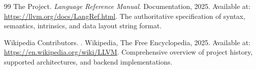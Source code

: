 \begin{thebibliography}{99}
The  Project. \textit{ Language Reference Manual}.  Documentation, 2025. Available at: \url{https://llvm.org/docs/LangRef.html}. The authoritative specification of   syntax, semantics, intrinsics, and data layout string format.

Wikipedia Contributors. \textit{}. Wikipedia, The Free Encyclopedia, 2025. Available at: \url{https://en.wikipedia.org/wiki/LLVM}. Comprehensive overview of  project history, supported architectures, and backend implementations.
\end{thebibliography}
